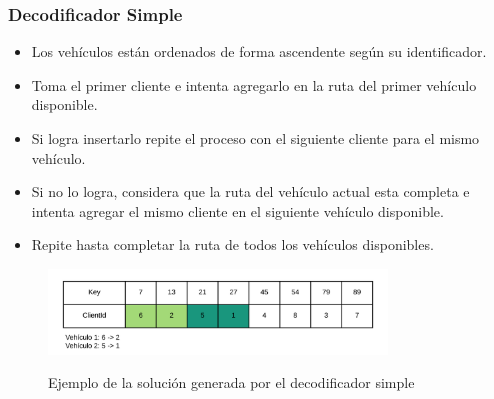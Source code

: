\documentclass{beamer}
\begin{document}
\begin{frame}
\frametitle{Decodificador Simple}

\begin{itemize}
    \item Los vehículos están ordenados de forma ascendente según su identificador.
    \pause
    \item Toma el primer cliente e intenta agregarlo en la ruta del primer vehículo disponible.
    \pause
    \item Si logra insertarlo repite el proceso con el siguiente cliente para el mismo vehículo.
    \pause
    \item Si no lo logra, considera que la ruta del vehículo actual esta completa e intenta agregar el mismo cliente en el siguiente vehículo disponible.
    \pause
    \item Repite hasta completar la ruta de todos los vehículos disponibles.
    \pause
\end{itemize}

\begin{figure}[h]
	\caption{Ejemplo de la solución generada por el decodificador simple}
	\centering
	\includegraphics[width=9cm]{DistribucionClientesDecoSimple}
	\label{fig:DistribucionClientesDecoSimple}
\end{figure}

\end{frame}

\end{document}
